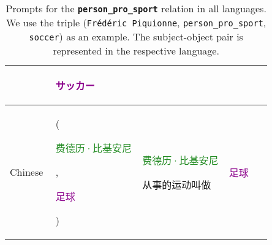 \begin{table*}[htbp]
\begin{center}
\begin{tabular}{m{0.10\linewidth} p{0.30\linewidth} p{0.30\linewidth} m{0.15\linewidth}}
    & {\centering \textcolor{darkmagenta}{\begin{CJK}{UTF8}{min}サッカー\end{CJK}}} \\
\midrule
{\centering Chinese} 
    & {\raggedright (\textcolor{forestgreen}{\begin{CJK}{UTF8}{gbsn}费德历·比基安尼\end{CJK}}, \textcolor{darkmagenta}{\begin{CJK}{UTF8}{gbsn}足球\end{CJK}})}
    & \textcolor{forestgreen}{\begin{CJK}{UTF8}{gbsn}费德历·比基安尼\end{CJK}}\begin{CJK}{UTF8}{gbsn}从事的运动叫做\end{CJK}
    & {\centering \textcolor{darkmagenta}{\begin{CJK}{UTF8}{gbsn}足球\end{CJK}}} \\
\bottomrule
\end{tabular}
\end{center}
\caption{Prompts for the \textbf{\texttt{person\_pro\_sport}} relation in all languages. We use the triple (\texttt{Frédéric Piquionne}, \texttt{person\_pro\_sport}, \texttt{soccer}) as an example. The subject-object pair is represented in the respective language.}
\label{tab:prompts_person_pro_sport}
\end{table*}

